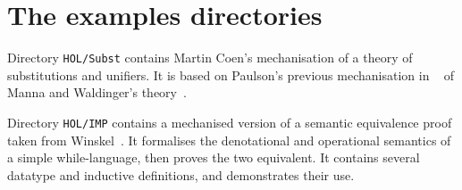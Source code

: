   \underscoreoff


\section{The examples directories}
Directory {\tt HOL/Subst} contains Martin Coen's mechanisation of a theory of
substitutions and unifiers.  It is based on Paulson's previous
mechanisation in {\LCF}~\cite{paulson85} of Manna and Waldinger's
theory~\cite{mw81}. 

Directory {\tt HOL/IMP} contains a mechanised version of a semantic
equivalence proof taken from Winskel~\cite{winskel93}.  It formalises the
denotational and operational semantics of a simple while-language, then
proves the two equivalent.  It contains several datatype and inductive
definitions, and demonstrates their use.

